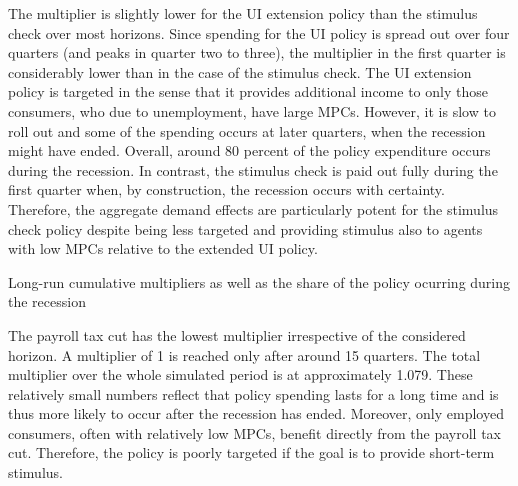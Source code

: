 \documentclass[../HAFiscal]{subfiles}
\begin{document}
The multiplier is slightly lower for the UI extension policy than the stimulus check over most horizons. Since spending for the UI policy is spread out over four quarters (and peaks in quarter two to three), the multiplier in the first quarter is considerably lower than in the case of the stimulus check. The UI extension policy is targeted in the sense that it provides additional income to only those consumers, who due to unemployment, have large MPCs. However, it is slow to roll out and some of the spending occurs at later quarters, when the recession might have ended. Overall, around 80 percent of the policy expenditure occurs during the recession. In contrast, the stimulus check is paid out fully during the first quarter when, by construction, the recession occurs with certainty. Therefore, the aggregate demand effects are particularly potent for the stimulus check policy despite being less targeted and providing stimulus also to agents with low MPCs relative to the extended UI policy.

\begin{table}[t]
	\center
	
	\caption{Long-run cumulative multipliers as well as the share of the policy ocurring during the recession}
	\label{tab:Multiplier}
\end{table}

The payroll tax cut has the lowest multiplier irrespective of the considered horizon. A multiplier of 1 is reached only after around 15 quarters. The total multiplier over the whole simulated period is at approximately 1.079. These relatively small numbers reflect that policy spending lasts for a long time and is thus more likely to occur after the recession has ended. Moreover, only employed consumers, often with relatively low MPCs, benefit directly from the payroll tax cut. Therefore, the policy is poorly targeted if the goal is to provide short-term stimulus. 
\end{document}
